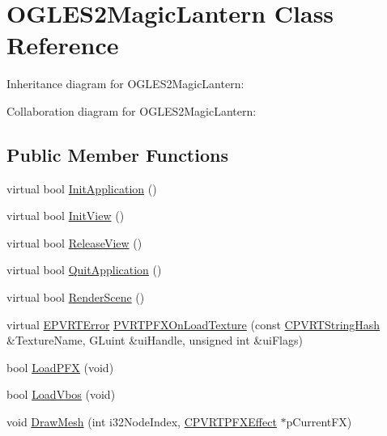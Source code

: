 \hypertarget{class_o_g_l_e_s2_magic_lantern}{\section{O\+G\+L\+E\+S2\+Magic\+Lantern Class Reference}
\label{class_o_g_l_e_s2_magic_lantern}
}


Inheritance diagram for O\+G\+L\+E\+S2\+Magic\+Lantern\+:


Collaboration diagram for O\+G\+L\+E\+S2\+Magic\+Lantern\+:
\subsection*{Public Member Functions}
\begin{DoxyCompactItemize}
\item 
virtual bool \hyperlink{class_o_g_l_e_s2_magic_lantern_a93a527a6de384b31ec426d2e4d03ac60}{Init\+Application} ()
\item 
virtual bool \hyperlink{class_o_g_l_e_s2_magic_lantern_ad816c13d43fda876acf6ffda709b4b33}{Init\+View} ()
\item 
virtual bool \hyperlink{class_o_g_l_e_s2_magic_lantern_aeecc9bb54a8e14e881caa260e72bbeeb}{Release\+View} ()
\item 
virtual bool \hyperlink{class_o_g_l_e_s2_magic_lantern_aeb285d2635323cc8728dc2ca8556356b}{Quit\+Application} ()
\item 
virtual bool \hyperlink{class_o_g_l_e_s2_magic_lantern_a8a871ffcbbd00d419fdaf1c0c99c154f}{Render\+Scene} ()
\item 
virtual \hyperlink{_p_v_r_t_error_8h_a9e837ff1a83f3a5f332bc4cc78454608}{E\+P\+V\+R\+T\+Error} \hyperlink{class_o_g_l_e_s2_magic_lantern_a1acf935737794f6c7d6408aaa298d31b}{P\+V\+R\+T\+P\+F\+X\+On\+Load\+Texture} (const \hyperlink{class_c_p_v_r_t_string_hash}{C\+P\+V\+R\+T\+String\+Hash} \&Texture\+Name, G\+Luint \&ui\+Handle, unsigned int \&ui\+Flags)
\item 
bool \hyperlink{class_o_g_l_e_s2_magic_lantern_afd2b128c880036e1c74b005ff982af4a}{Load\+P\+F\+X} (void)
\item 
bool \hyperlink{class_o_g_l_e_s2_magic_lantern_a1131bdbc1d74451534c9c98330b2603f}{Load\+Vbos} (void)
\item 
void \hyperlink{class_o_g_l_e_s2_magic_lantern_a4cca45357aceed1da48bf0be2cbd1b7e}{Draw\+Mesh} (int i32\+Node\+Index, \hyperlink{class_c_p_v_r_t_p_f_x_effect}{C\+P\+V\+R\+T\+P\+F\+X\+Effect} $\ast$p\+Current\+F\+X)
\end{DoxyCompactItemize}


